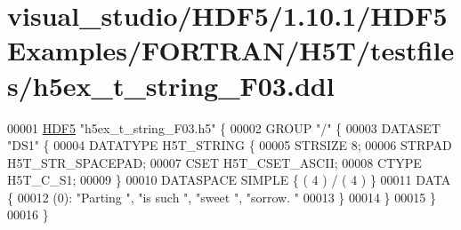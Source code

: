 \hypertarget{visual__studio_2_h_d_f5_21_810_81_2_h_d_f5_examples_2_f_o_r_t_r_a_n_2_h5_t_2testfiles_2h5ex__t__string___f03_8ddl_source}{}\section{visual\+\_\+studio/\+H\+D\+F5/1.10.1/\+H\+D\+F5\+Examples/\+F\+O\+R\+T\+R\+A\+N/\+H5\+T/testfiles/h5ex\+\_\+t\+\_\+string\+\_\+\+F03.ddl}
\label{visual__studio_2_h_d_f5_21_810_81_2_h_d_f5_examples_2_f_o_r_t_r_a_n_2_h5_t_2testfiles_2h5ex__t__string___f03_8ddl_source}

\begin{DoxyCode}
00001 \hyperlink{namespace_h_d_f5}{HDF5} \textcolor{stringliteral}{"h5ex\_t\_string\_F03.h5"} \{
00002 GROUP \textcolor{stringliteral}{"/"} \{
00003    DATASET \textcolor{stringliteral}{"DS1"} \{
00004       DATATYPE  H5T\_STRING \{
00005          STRSIZE 8;
00006          STRPAD H5T\_STR\_SPACEPAD;
00007          CSET H5T\_CSET\_ASCII;
00008          CTYPE H5T\_C\_S1;
00009       \}
00010       DATASPACE  SIMPLE \{ ( 4 ) / ( 4 ) \}
00011       DATA \{
00012       (0): \textcolor{stringliteral}{"Parting "}, \textcolor{stringliteral}{"is such "}, \textcolor{stringliteral}{"sweet   "}, \textcolor{stringliteral}{"sorrow. "}
00013       \}
00014    \}
00015 \}
00016 \}
\end{DoxyCode}
